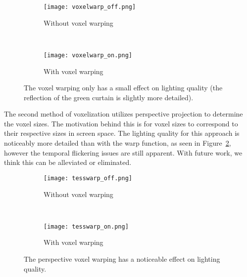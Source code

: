 \begin{figure}[h!]
    \centering
    \begin{subfigure}[t]{0.475\textwidth}
        \texttt{[image: voxelwarp\_off.png]}
        \caption{Without voxel warping}
    \end{subfigure}
    ~
    \begin{subfigure}[t]{0.475\textwidth}
        \texttt{[image: voxelwarp\_on.png]}
        \caption{With voxel warping}
    \end{subfigure}
    \caption{The voxel warping only has a small effect on lighting quality (the reflection of the green curtain is slightly more detailed).}
    \label{fig:results_voxelwarp}
\end{figure}

The second method of voxelization utilizes perspective projection to determine the voxel sizes. The motivation behind this is for voxel sizes to correspond to their respective sizes in screen space. The lighting quality for this approach is noticeably more detailed than with the warp function, as seen in Figure~\ref{fig:results_tesswarp}, however the temporal flickering issues are still apparent. With future work, we think this can be alleviated or eliminated.

\begin{figure}
    \centering
    \begin{subfigure}[t]{0.475\textwidth}
        \texttt{[image: tesswarp\_off.png]}
        \caption{Without voxel warping}
    \end{subfigure}
    ~
    \begin{subfigure}[t]{0.475\textwidth}
        \texttt{[image: tesswarp\_on.png]}
        \caption{With voxel warping}
    \end{subfigure}
    \caption{The perspective voxel warping has a noticeable effect on lighting quality.}
    \label{fig:results_tesswarp}
\end{figure}
